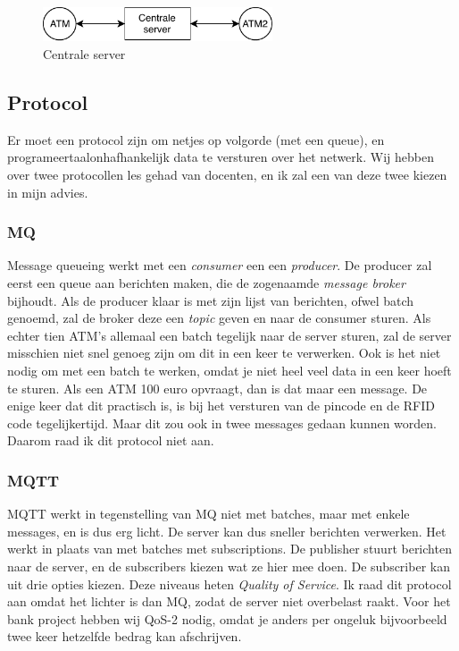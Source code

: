 \documentclass{article}
\begin{document}
\begin{figure}[!h]
        \centering
        \includegraphics[height=0.4in]{centrale_server.pdf}
        \caption{Centrale server}
        \label{fig: centrale server}
\end{figure}

\newpage

\subsection{Protocol}

Er moet een protocol zijn om netjes op volgorde (met een queue), en programeertaalonhafhankelijk data te versturen over het netwerk.
Wij hebben over twee protocollen les gehad van docenten, en ik zal een van deze twee kiezen in mijn advies.

\subsubsection{MQ}

Message queueing werkt met een \emph{consumer} een een \emph{producer}.
De producer zal eerst een queue aan berichten maken, die de zogenaamde \emph{message broker} bijhoudt.
Als de producer klaar is met zijn lijst van berichten, ofwel batch genoemd, zal de broker deze een \emph{topic} geven en naar de consumer sturen.
Als echter tien ATM's allemaal een batch tegelijk naar de server sturen, zal de server misschien niet snel genoeg zijn om dit in een keer te verwerken.
Ook is het niet nodig om met een batch te werken, omdat je niet heel veel data in een keer hoeft te sturen.
Als een ATM 100 euro opvraagt, dan is dat maar een message.
De enige keer dat dit practisch is, is bij het versturen van de pincode en de RFID code tegelijkertijd.
Maar dit zou ook in twee messages gedaan kunnen worden.
Daarom raad ik dit protocol niet aan.

\subsubsection{MQTT}

MQTT werkt in tegenstelling van MQ niet met batches, maar met enkele messages, en is dus erg licht.
De server kan dus sneller berichten verwerken.
Het werkt in plaats van met batches met subscriptions.
De publisher stuurt berichten naar de server, en de subscribers kiezen wat ze hier mee doen.
De subscriber kan uit drie opties kiezen.
Deze niveaus heten \emph{Quality of Service}.
Ik raad dit protocol aan omdat het lichter is dan MQ, zodat de server niet overbelast raakt.
Voor het bank project hebben wij QoS-2 nodig, omdat je anders per ongeluk bijvoorbeeld twee keer hetzelfde bedrag kan afschrijven.
\end{document}
